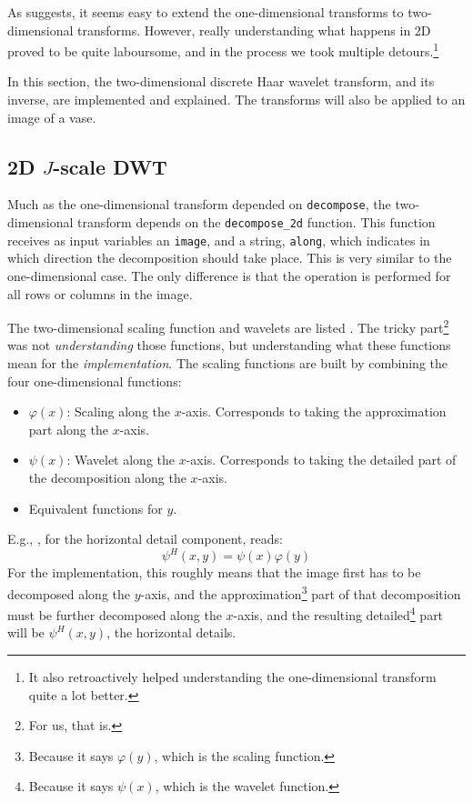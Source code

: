 As \cite[p. 501]{gonzalez2002digital} suggests, it seems easy to extend the one-dimensional transforms to two-dimensional transforms.
However, really understanding what happens in 2D proved to be quite laboursome, and in the process we took multiple detours.\footnote{It also retroactively helped understanding the one-dimensional transform quite a lot better.}

In this section, the two-dimensional discrete Haar wavelet transform, and its inverse, are implemented and explained.
The transforms will also be applied to an image of a vase.

\subsection{\texorpdfstring{2D \(J\)-scale DWT}{2D J-scale DWT}}
Much as the one-dimensional transform depended on \texttt{decompose}, the two-dimensional transform depends on the \texttt{decompose\_2d} function.
This function receives as input variables an \texttt{image}, and a string, \texttt{along}, which indicates in which direction the decomposition should take place.
This is very similar to the one-dimensional case.
The only difference is that the operation is performed for all rows or columns in the image.

The two-dimensional scaling function and wavelets are listed \cite[Eq 7.5-1 through 7.5-4]{gonzalez2002digital}.
The tricky part\footnote{For us, that is.} was not \emph{understanding} those functions, but understanding what these functions mean for the \emph{implementation}.
The scaling functions are built by combining the four one-dimensional functions:
\begin{itemize}
	\item \(\varphi(x)\): Scaling along the \(x\)-axis. Corresponds to taking the approximation part along the \(x\)-axis.
	\item \(\psi(x)\): Wavelet along the \(x\)-axis. Corresponds to taking the detailed part of the decomposition along the \(x\)-axis.
	\item Equivalent functions for \(y\).
\end{itemize}
E.g., \cite[Eq. 7.5-2]{gonzalez2002digital}, for the horizontal detail component, reads:
\[\psi^H(x, y) = \psi(x)\varphi(y)\]
For the implementation, this roughly means that the image first has to be decomposed along the \(y\)-axis, and the approximation\footnote{Because it says \(\varphi(y)\), which is the scaling function.} part of that decomposition must be further decomposed along the \(x\)-axis, and the resulting detailed\footnote{Because it says \(\psi(x)\), which is the wavelet function.} part will be \(\psi^H(x, y)\), the horizontal details.

